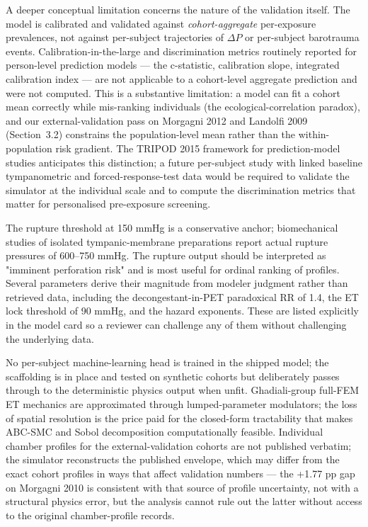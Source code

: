 \documentclass[11pt,a4paper]{article}
\begin{document}
A deeper conceptual limitation concerns the nature of the validation itself. The model is calibrated and validated against \emph{cohort-aggregate} per-exposure prevalences, not against per-subject trajectories of $\Delta P$ or per-subject barotrauma events. Calibration-in-the-large and discrimination metrics routinely reported for person-level prediction models --- the c-statistic, calibration slope, integrated calibration index --- are not applicable to a cohort-level aggregate prediction and were not computed. This is a substantive limitation: a model can fit a cohort mean correctly while mis-ranking individuals (the ecological-correlation paradox), and our external-validation pass on Morgagni 2012 and Landolfi 2009 (Section~3.2) constrains the population-level mean rather than the within-population risk gradient. The TRIPOD 2015 framework for prediction-model studies anticipates this distinction; a future per-subject study with linked baseline tympanometric and forced-response-test data would be required to validate the simulator at the individual scale and to compute the discrimination metrics that matter for personalised pre-exposure screening.

The rupture threshold at 150 mmHg is a conservative anchor; biomechanical studies of isolated tympanic-membrane preparations report actual rupture pressures of 600--750 mmHg. The rupture output should be interpreted as "imminent perforation risk" and is most useful for ordinal ranking of profiles. Several parameters derive their magnitude from modeler judgment rather than retrieved data, including the decongestant-in-PET paradoxical RR of 1.4, the ET lock threshold of 90 mmHg, and the hazard exponents. These are listed explicitly in the model card so a reviewer can challenge any of them without challenging the underlying data.

No per-subject machine-learning head is trained in the shipped model; the scaffolding is in place and tested on synthetic cohorts but deliberately passes through to the deterministic physics output when unfit. Ghadiali-group full-FEM ET mechanics are approximated through lumped-parameter modulators; the loss of spatial resolution is the price paid for the closed-form tractability that makes ABC-SMC and Sobol decomposition computationally feasible. Individual chamber profiles for the external-validation cohorts are not published verbatim; the simulator reconstructs the published envelope, which may differ from the exact cohort profiles in ways that affect validation numbers --- the +1.77 pp gap on Morgagni 2010 is consistent with that source of profile uncertainty, not with a structural physics error, but the analysis cannot rule out the latter without access to the original chamber-profile records.
\end{document}
